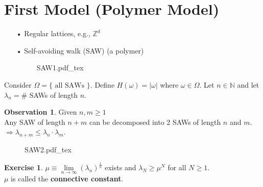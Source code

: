 \documentclass[12pt,a4paper]{report}
\theoremstyle{definition}
\newtheorem{ex}{Exercise}
\newtheorem{observation}{Observation}
\newcommand{\incfig}[1]{%
{#1.pdf_tex}
}
\begin{document}
\section{First Model (Polymer Model)}
\begin{enumerate}
	\item[•] Regular lattices, e.g., $\mathbb{Z}^d$
	\item[•] Self-avoiding walk (SAW) (a polymer)
	\begin{figure}[htp]
	\centering
	\def\svgwidth{7cm}
	\incfig{SAW1}
	\end{figure}
\end{enumerate}
	Consider $\Omega=\{\mbox{ all SAWs } \}$. Define $H(\omega)=|\omega|$ where $\omega\in\Omega$. Let $n\in \mathbb{N}$ and let $\lambda_n=\#$ SAWs of length $n.$
	\begin{observation} Given $n,m\geq 1$\\
	Any SAW of length $n+m$ can be decomposed into 2 SAWs of length $n$ and $m.$\\
	$\Rightarrow \lambda_{n+m}\leq \lambda_n\cdot \lambda_m.$
	\end{observation}
	\begin{figure}[htp]
	\centering
	\def\svgwidth{7cm}
	\incfig{SAW2}
	\end{figure}
	\begin{ex} $\mu\equiv \lim\limits_{n\to\infty}(\lambda_n)^{\frac{1}{n}}$ exists and $\lambda_N\geq \mu^N$ for all $N\geq 1.$ \\$\mu$ is called the \textbf{connective constant}.  \end{ex}
\end{document}
